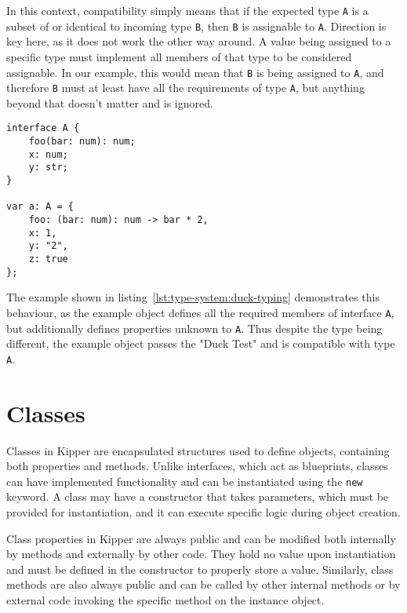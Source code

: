 In this context, compatibility simply means that if the expected type \lstinline|A| is a subset of or identical to incoming type \lstinline|B|, then \lstinline|B| is assignable to \lstinline|A|. Direction is key here, as it does not work the other way around. A value being assigned to a specific type must implement all members of that type to be considered assignable. In our example, this would mean that \lstinline|B| is being assigned to \lstinline|A|, and therefore \lstinline|B| must at least have all the requirements of type \lstinline|A|, but anything beyond that doesn't matter and is ignored.

\begin{lstlisting}[language=Kipper,caption=Demonstration of duck typing within Kipper,label=lst:type-system:duck-typing]
interface A {
	foo(bar: num): num;
	x: num;
	y: str;
}

var a: A = {
	foo: (bar: num): num -> bar * 2,
	x: 1,
	y: "2",
	z: true
};
\end{lstlisting}

The example shown in listing~\ref{lst:type-system:duck-typing} demonstrates this behaviour, as the example object defines all the required members of interface \lstinline|A|, but additionally defines properties unknown to \lstinline|A|. Thus despite the type being different, the example object passes the "Duck Test" and is compatible with type \lstinline|A|.

\section{Classes}
\label{sec:kipper-classes}

Classes in Kipper are encapsulated structures used to define objects, containing both properties and methods. Unlike interfaces, which act as blueprints, classes can have implemented functionality and can be instantiated using the \lstinline|new| keyword. A class may have a constructor that takes parameters, which must be provided for instantiation, and it can execute specific logic during object creation.

Class properties in Kipper are always public and can be modified both internally by methods and externally by other code. They hold no value upon instantiation and must be defined in the constructor to properly store a value. Similarly, class methods are also always public and can be called by other internal methods or by external code invoking the specific method on the instance object.

